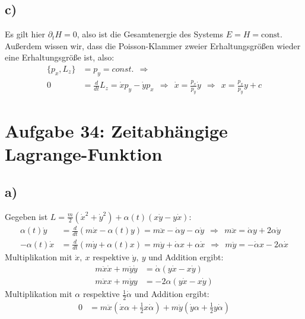 \documentclass[a4paper,12pt]{article}
\begin{document}
\subsection*{c)} Es gilt hier $\partial_t H=0$, also ist die Gesamtenergie des Systems $E=H=\textrm{const}$. Außerdem wissen wir, dass die Poisson-Klammer zweier Erhaltungsgrößen wieder eine Erhaltungsgröße ist, also:
\begin{align*}
\{p_x,L_z\}&=p_y=const.\ \ \Rightarrow \\
0&=\frac{d}{dt}L_z=\dot{x}p_y-\dot{y}p_x\ \ \Rightarrow\ \ \dot{x}=\frac{p_x}{p_y}\dot{y}\ \ \Rightarrow\ \ x=\frac{p_x}{p_y}y+c
\end{align*}

\section*{Aufgabe 34: Zeitabhängige Lagrange-Funktion}
\subsection*{a)} Gegeben ist $L=\frac{m}{2} (\dot{x}^2+\dot{y}^2)+\alpha(t)(x\dot{y}-y\dot{x})$:
\begin{align*}
\alpha(t)\dot{y}&=\frac{d}{dt}(m\dot{x}-\alpha(t)y)=m\ddot{x}-\dot{\alpha}y-\alpha\dot{y}\ \ \Rightarrow\ \ m\ddot{x}=\dot{\alpha}y+2\alpha\dot{y}\\
-\alpha(t)\dot{x}&=\frac{d}{dt}(m\dot{y}+\alpha(t)x)=m\ddot{y}+\dot{\alpha}x+\alpha\dot{x}\ \ \Rightarrow\ \ m\ddot{y}=-\dot{\alpha}x-2\alpha\dot{x}
\end{align*}
Multiplikation mit $\dot{x},\ x$ respektive $\dot{y},\ y$ und Addition ergibt:
\begin{align*}
m\ddot{x}\dot{x}+m\ddot{y}\dot{y}&=\dot{\alpha}(y\dot{x}-x\dot{y})\\
m\ddot{x}x+m\ddot{y}y&=-2\alpha(y\dot{x}-x\dot{y})
\end{align*}
Multiplikation mit $\alpha$ respektive $\frac{1}{2}\dot{\alpha}$ und Addition ergibt:
\begin{align*}
0&=m\ddot{x}(\dot{x}\alpha+\frac12 x\dot{\alpha})+m\ddot{y}(\dot{y}\alpha +\frac12 y\dot{\alpha})
\end{align*}
\end{document}
